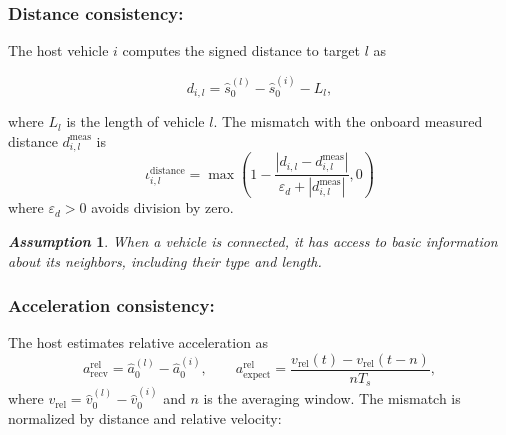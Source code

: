 \documentclass{ifacconf}
\newtheorem{remark}{\it \textbf{Remark}}%
\newtheorem{assumption}{\it \textbf{Assumption}}%
\begin{document}
\subsubsection{Distance consistency:}
The host vehicle $i$ computes the signed distance to target $l$ as

\begin{equation*}
    d_{i,l} = \hat{s}_{0}^{(l)} - \hat{s}_{0}^{(i)} - L_l,
\end{equation*} 

where $L_l$ is the length of vehicle $l$. 
The mismatch with the onboard measured distance $d_{i,l}^{\text{meas}}$ is
\begin{equation*}
    \iota_{i,l}^{\text{distance}} =
    \max\left(
    1-\frac{|d_{i,l}-d_{i,l}^{\text{meas}}|}
    {\varepsilon_d+|d_{i,l}^{\text{meas}}|},
    0
    \right)
\end{equation*}
where $\varepsilon_d>0$ avoids division by zero.
\begin{assumption}\label{assum_connect}
When a vehicle is connected, it has access to basic information about its neighbors, including their type and length.
\end{assumption}

\subsubsection{Acceleration consistency:}


The host estimates relative acceleration as
\[
a_{\text{recv}}^{\text{rel}} = \hat{a}_0^{(l)} - \hat{a}_0^{(i)}, \qquad
a_{\text{expect}}^{\text{rel}} = \frac{v_{\text{rel}}(t) - v_{\text{rel}}(t-n)}{nT_s},
\]
where \(v_{\text{rel}} = \hat{v}_0^{(l)} - \hat{v}_0^{(i)}\) and \(n\) is the averaging window. The mismatch is normalized by distance and relative velocity:
\end{document}

